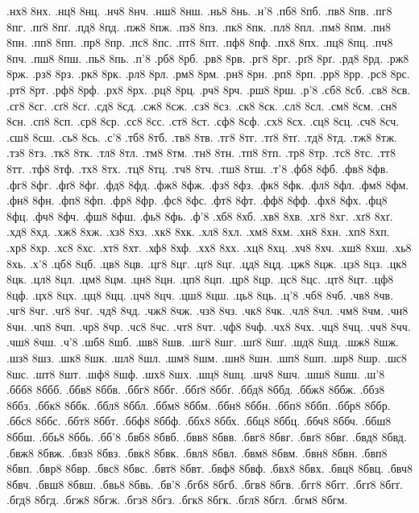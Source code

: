 {.нх8 8нх.
.нц8 8нц.
.нч8 8нч.
.нш8 8нш.
.нь8 8нь.
.н'8
.пб8 8пб.
.пв8 8пв.
.пг8 8пг.
.пґ8 8пґ.
.пд8 8пд.
.пж8 8пж.
.пз8 8пз.
.пк8 8пк.
.пл8 8пл.
.пм8 8пм.
.пн8 8пн.
.пп8 8пп.
.пр8 8пр.
.пс8 8пс.
.пт8 8пт.
.пф8 8пф.
.пх8 8пх.
.пц8 8пц.
.пч8 8пч.
.пш8 8пш.
.пь8 8пь.
.п'8
.рб8 8рб.
.рв8 8рв.
.рг8 8рг.
.рґ8 8рґ.
.рд8 8рд.
.рж8 8рж.
.рз8 8рз.
.рк8 8рк.
.рл8 8рл.
.рм8 8рм.
.рн8 8рн.
.рп8 8рп.
.рр8 8рр.
.рс8 8рс.
.рт8 8рт.
.рф8 8рф.
.рх8 8рх.
.рц8 8рц.
.рч8 8рч.
.рш8 8рш.
.р'8
.сб8 8сб.
.св8 8св.
.сг8 8сг.
.сґ8 8сґ.
.сд8 8сд.
.сж8 8сж.
.сз8 8сз.
.ск8 8ск.
.сл8 8сл.
.см8 8см.
.сн8 8сн.
.сп8 8сп.
.ср8 8ср.
.сс8 8сс.
.ст8 8ст.
.сф8 8сф.
.сх8 8сх.
.сц8 8сц.
.сч8 8сч.
.сш8 8сш.
.сь8 8сь.
.с'8
.тб8 8тб.
.тв8 8тв.
.тг8 8тг.
.тґ8 8тґ.
.тд8 8тд.
.тж8 8тж.
.тз8 8тз.
.тк8 8тк.
.тл8 8тл.
.тм8 8тм.
.тн8 8тн.
.тп8 8тп.
.тр8 8тр.
.тс8 8тс.
.тт8 8тт.
.тф8 8тф.
.тх8 8тх.
.тц8 8тц.
.тч8 8тч.
.тш8 8тш.
.т'8
.фб8 8фб.
.фв8 8фв.
.фг8 8фг.
.фґ8 8фґ.
.фд8 8фд.
.фж8 8фж.
.фз8 8фз.
.фк8 8фк.
.фл8 8фл.
.фм8 8фм.
.фн8 8фн.
.фп8 8фп.
.фр8 8фр.
.фс8 8фс.
.фт8 8фт.
.фф8 8фф.
.фх8 8фх.
.фц8 8фц.
.фч8 8фч.
.фш8 8фш.
.фь8 8фь.
.ф'8
.хб8 8хб.
.хв8 8хв.
.хг8 8хг.
.хґ8 8хґ.
.хд8 8хд.
.хж8 8хж.
.хз8 8хз.
.хк8 8хк.
.хл8 8хл.
.хм8 8хм.
.хн8 8хн.
.хп8 8хп.
.хр8 8хр.
.хс8 8хс.
.хт8 8хт.
.хф8 8хф.
.хх8 8хх.
.хц8 8хц.
.хч8 8хч.
.хш8 8хш.
.хь8 8хь.
.х'8
.цб8 8цб.
.цв8 8цв.
.цг8 8цг.
.цґ8 8цґ.
.цд8 8цд.
.цж8 8цж.
.цз8 8цз.
.цк8 8цк.
.цл8 8цл.
.цм8 8цм.
.цн8 8цн.
.цп8 8цп.
.цр8 8цр.
.цс8 8цс.
.цт8 8цт.
.цф8 8цф.
.цх8 8цх.
.цц8 8цц.
.цч8 8цч.
.цш8 8цш.
.ць8 8ць.
.ц'8
.чб8 8чб.
.чв8 8чв.
.чг8 8чг.
.чґ8 8чґ.
.чд8 8чд.
.чж8 8чж.
.чз8 8чз.
.чк8 8чк.
.чл8 8чл.
.чм8 8чм.
.чн8 8чн.
.чп8 8чп.
.чр8 8чр.
.чс8 8чс.
.чт8 8чт.
.чф8 8чф.
.чх8 8чх.
.чц8 8чц.
.чч8 8чч.
.чш8 8чш.
.ч'8
.шб8 8шб.
.шв8 8шв.
.шг8 8шг.
.шґ8 8шґ.
.шд8 8шд.
.шж8 8шж.
.шз8 8шз.
.шк8 8шк.
.шл8 8шл.
.шм8 8шм.
.шн8 8шн.
.шп8 8шп.
.шр8 8шр.
.шс8 8шс.
.шт8 8шт.
.шф8 8шф.
.шх8 8шх.
.шц8 8шц.
.шч8 8шч.
.шш8 8шш.
.ш'8
.ббб8 8ббб.
.ббв8 8ббв.
.ббг8 8ббг.
.ббґ8 8ббґ.
.ббд8 8ббд.
.ббж8 8ббж.
.ббз8 8ббз.
.ббк8 8ббк.
.ббл8 8ббл.
.ббм8 8ббм.
.ббн8 8ббн.
.ббп8 8ббп.
.ббр8 8ббр.
.ббс8 8ббс.
.ббт8 8ббт.
.ббф8 8ббф.
.ббх8 8ббх.
.ббц8 8ббц.
.ббч8 8ббч.
.ббш8 8ббш.
.ббь8 8ббь.
.бб'8
.бвб8 8бвб.
.бвв8 8бвв.
.бвг8 8бвг.
.бвґ8 8бвґ.
.бвд8 8бвд.
.бвж8 8бвж.
.бвз8 8бвз.
.бвк8 8бвк.
.бвл8 8бвл.
.бвм8 8бвм.
.бвн8 8бвн.
.бвп8 8бвп.
.бвр8 8бвр.
.бвс8 8бвс.
.бвт8 8бвт.
.бвф8 8бвф.
.бвх8 8бвх.
.бвц8 8бвц.
.бвч8 8бвч.
.бвш8 8бвш.
.бвь8 8бвь.
.бв'8
.бгб8 8бгб.
.бгв8 8бгв.
.бгг8 8бгг.
.бгґ8 8бгґ.
.бгд8 8бгд.
.бгж8 8бгж.
.бгз8 8бгз.
.бгк8 8бгк.
.бгл8 8бгл.
.бгм8 8бгм.
}
